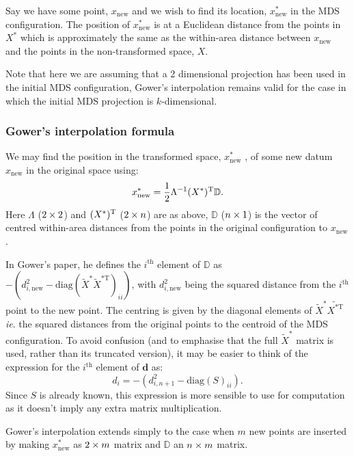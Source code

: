 Say we have some point, $x_{\text{new}}$ and we wish to find its location, $x^*_{\text{new}}$ in the MDS configuration. The position of $x^*_{\text{new}}$ is at a Euclidean distance from the points in $X^*$ which is approximately the same as the within-area distance between $x_{\text{new}}$ and the points in the non-transformed space, $X$. 

Note that here we are assuming that a 2 dimensional projection has been used in the initial MDS configuration, Gower's interpolation remains valid for the case in which the initial MDS projection is $k$-dimensional.

\subsubsection{Gower's interpolation formula}

We may find the position in the transformed space, $x^*_{\text{new}}$ , of some new datum $x_{\text{new}}$ in the original space using:
\begin{equation}
x^*_{\text{new}} = \frac{1}{2} \Lambda^{-1} (X^*)^{\text{T}} \mathbb{D}.
\label{gower}
\end{equation}
Here $\Lambda$ ($2 \times 2$) and $(X^*)^{\text{T}}$ ($2 \times n$) are as above, $\mathbb{D}$ ($n \times 1$) is the vector of centred within-area distances from the points in the original configuration to $x_{\text{new}}$.

In Gower's paper, he defines the $i^\text{th}$ element of $\mathbb{D}$ as $-(d^2_{i,\text{new}}-\text{diag}(\tilde{X}^* \tilde{X}^{*\text{T}})_{ii})$, with $d^2_{i,\text{new}}$ being the squared distance from the $i^\text{th}$ point to the new point. The centring is given by the diagonal elements of $\tilde{X}^*\tilde{X^{* \text{T}}}$ \emph{ie}. the squared distances from the original points to the centroid of the MDS configuration. To avoid confusion (and to emphasise that the full $\tilde{X}^*$ matrix is used, rather than its truncated version), it may be easier to think of the expression for the $i^\text{th}$ element of $\bm{d}$ as:
\begin{equation}
d_{i} = -(d^2_{i,n+1}-\text{diag}(S)_{ii}).
\end{equation}
Since $S$ is already known, this expression is more sensible to use for computation as it doesn't imply any extra matrix multiplication.

Gower's interpolation extends simply to the case when $m$ new points are inserted by making $x^*_{\text{new}}$ as $2 \times m$ matrix and $\mathbb{D}$ an $n \times m$ matrix.


